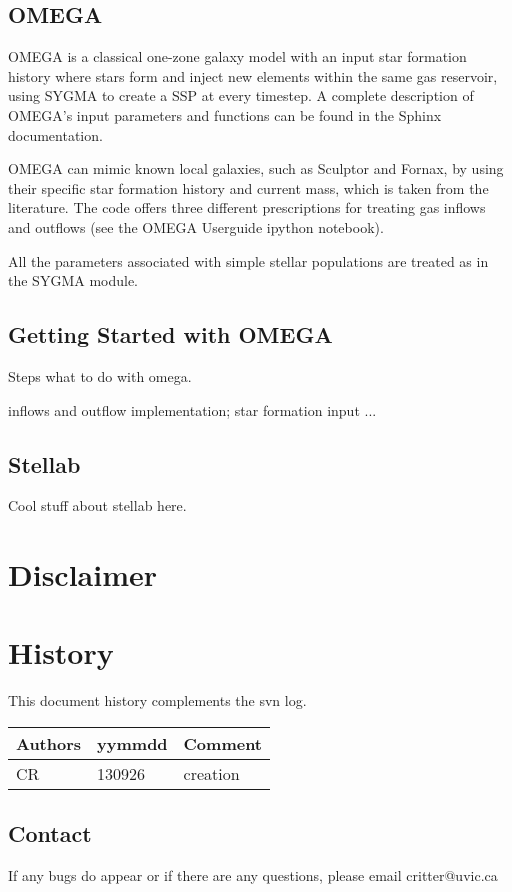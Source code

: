 \subsection{OMEGA}

OMEGA is a classical one-zone galaxy model with
an input star formation history
where stars form and inject new elements within
the same gas reservoir, using SYGMA to create a SSP at every timestep.
A complete description of OMEGA's input parameters and functions can
be found in the Sphinx documentation.  

OMEGA can mimic known local galaxies, such as Sculptor and Fornax, by
using their specific star formation history and current mass, which is taken
from the literature.  The code offers three different prescriptions for treating
gas inflows and outflows (see the OMEGA Userguide ipython notebook).

All the parameters associated with simple stellar populations are treated as
in the SYGMA module.


\subsection{Getting Started with OMEGA}

Steps what to do with omega.


inflows and outflow implementation;
star formation input ...

\subsection{Stellab}

Cool stuff about stellab here.

\section{Disclaimer}

		
\section{History} 
This document history complements the svn log.

\begin{tabular*}{\textwidth}{lll}
\hline
Authors & yymmdd & Comment \\
\hline
CR & 130926 & creation \\
\end{tabular*}


\subsection{Contact}
If any bugs do appear or if there are any questions, please email critter@uvic.ca
\begin{verbatim}

\end{verbatim}


